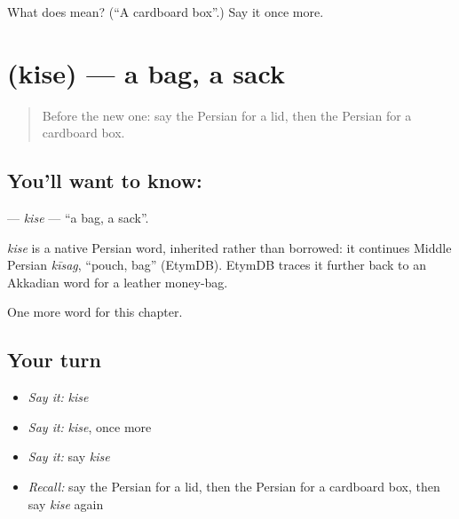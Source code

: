 \begin{tcolorbox}[breakable,colback=teal!4,colframe=teal!35!black,title={Before you move on}]
What does  mean? (\textquotedblleft{}A cardboard box\textquotedblright{}.) Say it once more.
\end{tcolorbox}
\section[\texorpdfstring{\fa{کیسه} (kise)}{کیسه (kise)}]{ (kise) — a bag, a sack}

\label{lesson:FA-C212-kise}



\begin{quote}
Before the new one: say the Persian for a lid, then the Persian for a cardboard box.
\end{quote}

\subsection*{You'll want to know: }
\textbf{} — \emph{kise} — \textquotedblleft{}a bag, a sack\textquotedblright{}.

\begin{cousinweb}
\emph{kise} is a native Persian word, inherited rather than borrowed: it continues Middle Persian \emph{kīsag}, \textquotedblleft{}pouch, bag\textquotedblright{} (EtymDB). EtymDB traces it further back to an Akkadian word for a leather money-bag.
\end{cousinweb}

\begin{grammarlens}[title={What you've built}]
One more word for this chapter.
\end{grammarlens}

\subsection*{Your turn}
\begin{itemize}
\raggedright
  \item \emph{Say it:} \emph{kise}
  \item \emph{Say it:} \emph{kise}, once more
  \item \emph{Say it:} say \emph{kise}
  \item \emph{Recall:} say the Persian for a lid, then the Persian for a cardboard box, then say \emph{kise} again
\end{itemize}

